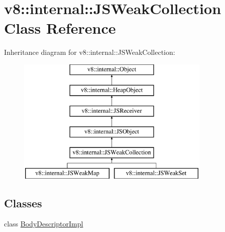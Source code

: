 \hypertarget{classv8_1_1internal_1_1_j_s_weak_collection}{}\section{v8\+:\+:internal\+:\+:J\+S\+Weak\+Collection Class Reference}
\label{classv8_1_1internal_1_1_j_s_weak_collection}
Inheritance diagram for v8\+:\+:internal\+:\+:J\+S\+Weak\+Collection\+:\begin{figure}[H]
\begin{center}
\leavevmode
\includegraphics[height=6.000000cm]{classv8_1_1internal_1_1_j_s_weak_collection}
\end{center}
\end{figure}
\subsection*{Classes}
\begin{DoxyCompactItemize}
\item 
class \hyperlink{classv8_1_1internal_1_1_j_s_weak_collection_1_1_body_descriptor_impl}{Body\+Descriptor\+Impl}
\end{DoxyCompactItemize}
